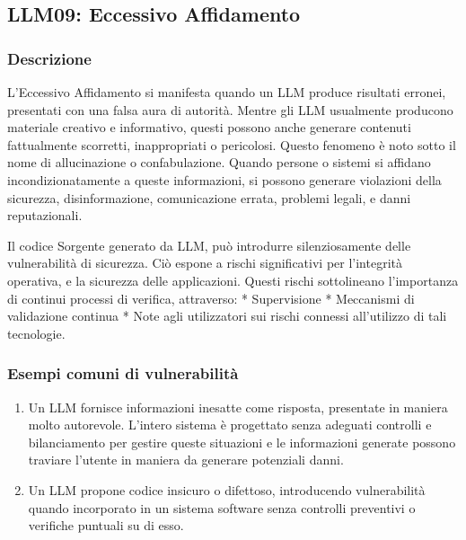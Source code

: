 \documentclass[
]{article}
\author{}
\date{}
\providecommand{\tightlist}{%
  \setlength{\itemsep}{0pt}\setlength{\parskip}{0pt}}
\begin{document}
\subsection{LLM09: Eccessivo
Affidamento}\label{llm09-eccessivo-affidamento}

\subsubsection{Descrizione}\label{descrizione}

L'Eccessivo Affidamento si manifesta quando un LLM produce risultati
erronei, presentati con una falsa aura di autorità. Mentre gli LLM
usualmente producono materiale creativo e informativo, questi possono
anche generare contenuti fattualmente scorretti, inappropriati o
pericolosi. Questo fenomeno è noto sotto il nome di allucinazione o
confabulazione. Quando persone o sistemi si affidano incondizionatamente
a queste informazioni, si possono generare violazioni della sicurezza,
disinformazione, comunicazione errata, problemi legali, e danni
reputazionali.

Il codice Sorgente generato da LLM, può introdurre silenziosamente delle
vulnerabilità di sicurezza. Ciò espone a rischi significativi per
l'integrità operativa, e la sicurezza delle applicazioni. Questi rischi
sottolineano l'importanza di continui processi di verifica, attraverso:
* Supervisione * Meccanismi di validazione continua * Note agli
utilizzatori sui rischi connessi all'utilizzo di tali tecnologie.

\subsubsection{Esempi comuni di
vulnerabilità}\label{esempi-comuni-di-vulnerabilituxe0}

\begin{enumerate}
\def\labelenumi{\arabic{enumi}.}
\tightlist
\item
  Un LLM fornisce informazioni inesatte come risposta, presentate in
  maniera molto autorevole. L'intero sistema è progettato senza adeguati
  controlli e bilanciamento per gestire queste situazioni e le
  informazioni generate possono traviare l'utente in maniera da generare
  potenziali danni.
\item
  Un LLM propone codice insicuro o difettoso, introducendo vulnerabilità
  quando incorporato in un sistema software senza controlli preventivi o
  verifiche puntuali su di esso.
\end{enumerate}
\end{document}

